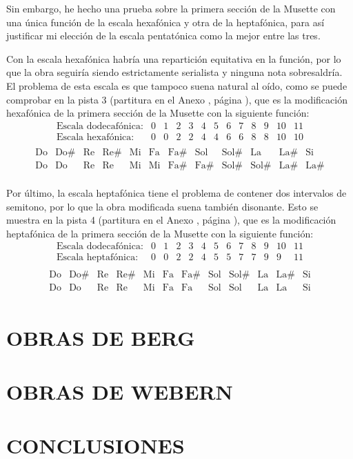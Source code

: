    	Sin embargo, he hecho una prueba sobre la primera sección de la Musette con una única función de la escala hexafónica y otra de la heptafónica, para así justificar mi elección de la escala pentatónica como la mejor entre las tres.
   	
   	Con la escala hexafónica habría una repartición equitativa en la función, por lo que la obra seguiría siendo estrictamente serialista y ninguna nota sobresaldría. El problema de esta escala es que tampoco suena natural al oído, como se puede comprobar en la pista 3 (partitura en el Anexo , página ), que es la modificación hexafónica de la primera sección de la Musette con la siguiente función:
   	$$\left.\begin{matrix}\text{Escala dodecafónica:}&0&1&2&3&4&5&6&7&8&9&10&11\\\text{Escala hexafónica:}&0&0&2&2&4&4&6&6&8&8&10&10\\\end{matrix}\right.$$
   	$$\left.\begin{matrix}\text{Do}&\text{Do\#}&\text{Re}&\text{Re\#}&\text{Mi}&\text{Fa}&\text{Fa\#}&\text{Sol}&\text{Sol\#}&\text{La}&\text{La\#}&\text{Si}\\\text{Do}&\text{Do}&\text{Re}&\text{Re}&\text{Mi}&\text{Mi}&\text{Fa\#}&\text{Fa\#}&\text{Sol\#}&\text{Sol\#}&\text{La\#}&\text{La\#}\\\end{matrix}\right.$$
   	
   	Por último, la escala heptafónica tiene el problema de contener dos intervalos de semitono, por lo que la obra modificada suena también disonante. Esto se muestra en la pista 4 (partitura en el Anexo , página ), que es la modificación heptafónica de la primera sección de la Musette con la siguiente función:
   	$$\left.\begin{matrix}\text{Escala dodecafónica:}&0&1&2&3&4&5&6&7&8&9&10&11\\\text{Escala heptafónica:}&0&0&2&2&4&5&5&7&7&9&9&11\\\end{matrix}\right.$$
   	$$\left.\begin{matrix}\text{Do}&\text{Do\#}&\text{Re}&\text{Re\#}&\text{Mi}&\text{Fa}&\text{Fa\#}&\text{Sol}&\text{Sol\#}&\text{La}&\text{La\#}&\text{Si}\\\text{Do}&\text{Do}&\text{Re}&\text{Re}&\text{Mi}&\text{Fa}&\text{Fa}&\text{Sol}&\text{Sol}&\text{La}&\text{La}&\text{Si}\\\end{matrix}\right.$$	
   
    \section{OBRAS DE BERG}
    \section{OBRAS DE WEBERN}
    \section{CONCLUSIONES}